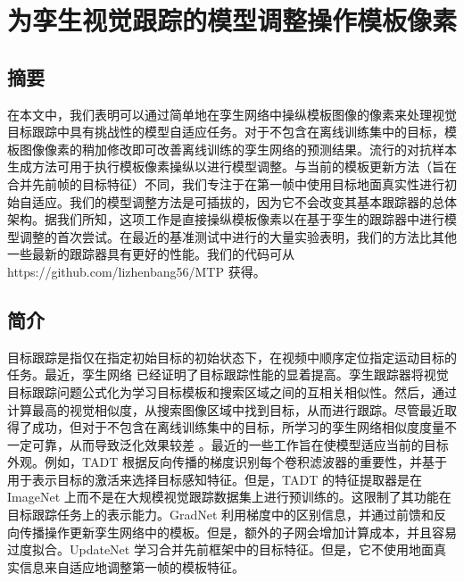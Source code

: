 \chapter{为孪生视觉跟踪的模型调整操作模板像素}\label{chap:MTP}

\section{摘要}
在本文中，我们表明可以通过简单地在孪生网络中操纵模板图像的像素来处理视觉目标跟踪中具有挑战性的模型自适应任务。对于不包含在离线训练集中的目标，模板图像像素的稍加修改即可改善离线训练的孪生网络的预测结果。流行的对抗样本生成方法可用于执行模板像素操纵以进行模型调整。与当前的模板更新方法（旨在合并先前帧的目标特征）不同，我们专注于在第一帧中使用目标地面真实性进行初始自适应。我们的模型调整方法是可插拔的，因为它不会改变其基本跟踪器的总体架构。据我们所知，这项工作是直接操纵模板像素以在基于孪生的跟踪器中进行模型调整的首次尝试。在最近的基准测试中进行的大量实验表明，我们的方法比其他一些最新的跟踪器具有更好的性能。我们的代码可从 https://github.com/lizhenbang56/MTP 获得。

\section{简介}
目标跟踪是指仅在指定初始目标的初始状态下，在视频中顺序定位指定运动目标的任务。最近，孪生网络 \cite{danelljan2019atom, SiamFC} 已经证明了目标跟踪性能的显着提高。孪生跟踪器将视觉目标跟踪问题公式化为学习目标模板和搜索区域之间的互相关相似性。然后，通过计算最高的视觉相似度，从搜索图像区域中找到目标，从而进行跟踪。尽管最近取得了成功，但对于不包含在离线训练集中的目标，所学习的孪生网络相似度度量不一定可靠，从而导致泛化效果较差 \cite{Bhat_2019_ICCV}。最近的一些工作旨在使模型适应当前的目标外观。例如，TADT \cite{Li_2019_CVPR} 根据反向传播的梯度识别每个卷积滤波器的重要性，并基于用于表示目标的激活来选择目标感知特征。但是，TADT 的特征提取器是在 ImageNet \cite{VID} 上而不是在大规模视觉跟踪数据集上进行预训练的。这限制了其功能在目标跟踪任务上的表示能力。GradNet \cite{Li_2019_ICCV} 利用梯度中的区别信息，并通过前馈和反向传播操作更新孪生网络中的模板。但是，额外的子网会增加计算成本，并且容易过度拟合。UpdateNet \cite{Zhang_2019_ICCV} 学习合并先前框架中的目标特征。但是，它不使用地面真实信息来自适应地调整第一帧的模板特征。

